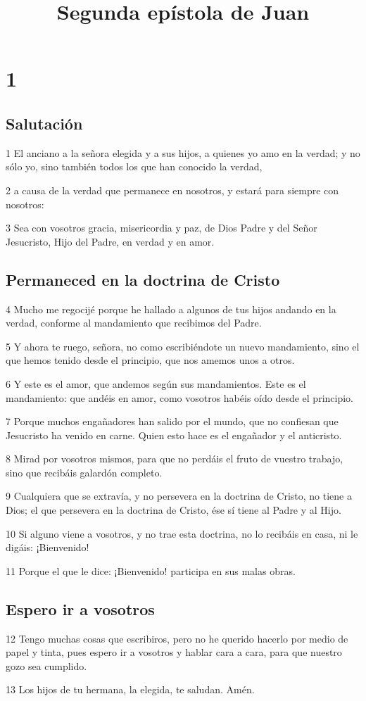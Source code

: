 
\title{Segunda epístola de Juan}

\chapter{1}

\section*{Salutación}

\par 1 El anciano a la señora elegida y a sus hijos, a quienes yo amo en la verdad; y no sólo yo, sino también todos los que han conocido la verdad,
\par 2 a causa de la verdad que permanece en nosotros, y estará para siempre con nosotros:
\par 3 Sea con vosotros gracia, misericordia y paz, de Dios Padre y del Señor Jesucristo, Hijo del Padre, en verdad y en amor.

\section*{Permaneced en la doctrina de Cristo}

\par 4 Mucho me regocijé porque he hallado a algunos de tus hijos andando en la verdad, conforme al mandamiento que recibimos del Padre.
\par 5 Y ahora te ruego, señora, no como escribiéndote un nuevo mandamiento, sino el que hemos tenido desde el principio, que nos amemos unos a otros.
\par 6 Y este es el amor, que andemos según sus mandamientos. Este es el mandamiento: que andéis en amor, como vosotros habéis oído desde el principio.
\par 7 Porque muchos engañadores han salido por el mundo, que no confiesan que Jesucristo ha venido en carne. Quien esto hace es el engañador y el anticristo.
\par 8 Mirad por vosotros mismos, para que no perdáis el fruto de vuestro trabajo, sino que recibáis galardón completo.
\par 9 Cualquiera que se extravía, y no persevera en la doctrina de Cristo, no tiene a Dios; el que persevera en la doctrina de Cristo, ése sí tiene al Padre y al Hijo.
\par 10 Si alguno viene a vosotros, y no trae esta doctrina, no lo recibáis en casa, ni le digáis: ¡Bienvenido!
\par 11 Porque el que le dice: ¡Bienvenido! participa en sus malas obras.

\section*{Espero ir a vosotros}

\par 12 Tengo muchas cosas que escribiros, pero no he querido hacerlo por medio de papel y tinta, pues espero ir a vosotros y hablar cara a cara, para que nuestro gozo sea cumplido.
\par 13 Los hijos de tu hermana, la elegida, te saludan. Amén.

